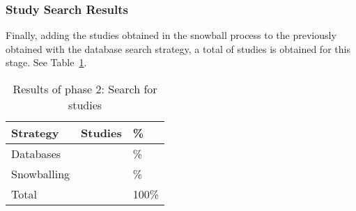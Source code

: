 \newcommand{\totalEtapaDos}{\fpeval{\screenTot + \snowballNewStudies}}
\newcommand{\dbPercentEtapa}{\fpeval{round(\screenTot*100/\totalEtapaDos,2)}}
\newcommand{\snowPercentEtapa}{\fpeval{round(\snowballNewStudies*100/\totalEtapaDos,2)}}

\subsubsection{Study Search Results}\label{subsubsec:resultados-busqueda}

Finally, adding the \snowballNewStudies{} studies obtained in the snowball process to the \screenTot{} previously obtained with the database search strategy, a total of \totalEtapaDos{} studies is obtained for this stage. See Table~\ref{table:resultados_etapa_2}.

\begin{table}[htbp]
    \centering
    \caption{Results of phase 2: Search for studies}
    \label{table:resultados_etapa_2}
    \renewcommand{\arraystretch}{1}  %
    \begin{tabular}{p{2.5cm}p{2.6cm}p{2.5cm}}
        \toprule
        \textbf{Strategy} & \textbf{Studies} & \textbf{\%} \\
        \midrule
        Databases & \screenTot{} & \dbPercentEtapa{}\% \\
        \addlinespace[0.8em]
        Snowballing & \snowballNewStudies{} & \snowPercentEtapa{}\% \\
        \addlinespace[0.8em]
        Total & \totalEtapaDos & 100\% \\
        \bottomrule
    \end{tabular}
\end{table}
